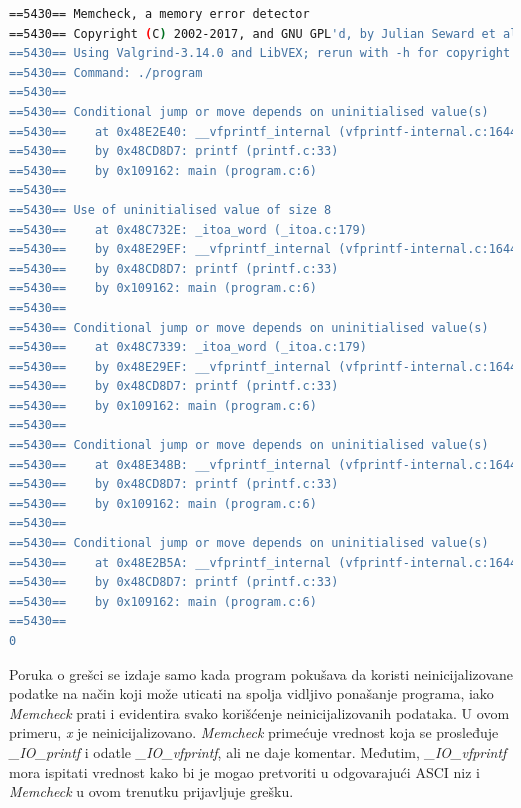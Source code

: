 \documentclass[12pt,oneside]{memoir}
\theoremstyle{plain}
\theoremstyle{definition}
\begin{document}


\begin{lstlisting}[style=terminal,caption={Primer ispisa greške korišćenja neinicijalizovanih vrednosti}, label={lst:slika2.5},language={bash}] 
==5430== Memcheck, a memory error detector
==5430== Copyright (C) 2002-2017, and GNU GPL'd, by Julian Seward et al. 
==5430== Using Valgrind-3.14.0 and LibVEX; rerun with -h for copyright info 
==5430== Command: ./program
==5430==
==5430== Conditional jump or move depends on uninitialised value(s)
==5430==	at 0x48E2E40: __vfprintf_internal (vfprintf-internal.c:1644)
==5430==	by 0x48CD8D7: printf (printf.c:33)
==5430==	by 0x109162: main (program.c:6)
==5430==
==5430== Use of uninitialised value of size 8
==5430==	at 0x48C732E: _itoa_word (_itoa.c:179)
==5430==	by 0x48E29EF: __vfprintf_internal (vfprintf-internal.c:1644)
==5430==	by 0x48CD8D7: printf (printf.c:33)
==5430==	by 0x109162: main (program.c:6)
==5430==
==5430== Conditional jump or move depends on uninitialised value(s)
==5430==	at 0x48C7339: _itoa_word (_itoa.c:179)
==5430==	by 0x48E29EF: __vfprintf_internal (vfprintf-internal.c:1644)
==5430==	by 0x48CD8D7: printf (printf.c:33)
==5430==	by 0x109162: main (program.c:6)
==5430==
==5430== Conditional jump or move depends on uninitialised value(s)
==5430==	at 0x48E348B: __vfprintf_internal (vfprintf-internal.c:1644)
==5430==	by 0x48CD8D7: printf (printf.c:33)
==5430==	by 0x109162: main (program.c:6)
==5430==
==5430== Conditional jump or move depends on uninitialised value(s)
==5430==	at 0x48E2B5A: __vfprintf_internal (vfprintf-internal.c:1644)
==5430==	by 0x48CD8D7: printf (printf.c:33)
==5430==	by 0x109162: main (program.c:6)
==5430==
0
\end{lstlisting}

Poruka o grešci se izdaje samo kada program pokušava da koristi neinicijalizovane podatke na način koji može uticati na spolja vidljivo ponašanje programa, iako \textit{Memcheck} prati i evidentira svako korišćenje neinicijalizovanih podataka. U ovom primeru, \textit{x} je neinicijalizovano. \textit{Memcheck} primećuje vrednost koja se prosleđuje \textit{\_IO\_printf} i odatle \textit{\_IO\_vfprintf}, ali ne daje komentar. Međutim, \textit{\_IO\_vfprintf} mora ispitati vrednost  kako bi je mogao pretvoriti u odgovarajući ASCI niz i \textit{Memcheck} u ovom trenutku prijavljuje grešku.
\end{document}
